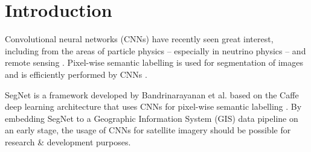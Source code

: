 \documentclass[fleqn,10pt]{SelfArx} %
\affiliation{\textsuperscript{1}\textit{UB}}
\affiliation{\textsuperscript{2}\textit{WB}}
\begin{document}
\flushbottom %

\maketitle %

\tableofcontents %

\thispagestyle{empty} %


\section{Introduction} %
Convolutional neural networks (CNNs) have recently seen great interest, including from the areas of particle physics  -- especially in neutrino physics \cite{Barnard:2016qma}\cite{Aurisano:2016jvx}\cite{Racah:2016gnm}\cite{Acciarri:2016ryt} -- and remote sensing \cite{xu2008cnn}\cite{hu2015transferring}. Pixel-wise semantic labelling is used for segmentation of images and is efficiently performed by CNNs \cite{BadrinarayananK15}. 

SegNet is a framework developed by Bandrinarayanan et al. based on the Caffe deep learning architecture \cite{jia2014caffe} that uses CNNs for pixel-wise semantic labelling \cite{BadrinarayananK15}. By embedding SegNet to a Geographic Information System (GIS) data pipeline on an early stage, the usage of CNNs for satellite imagery should be possible for research \& development purposes.

\end{document}
